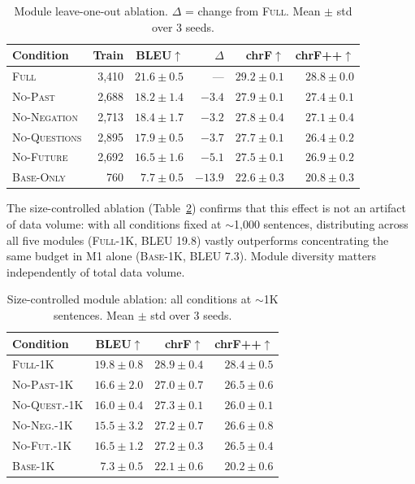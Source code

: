 \documentclass[11pt]{article}
\begin{document}
\begin{table}[t]
\centering
\small
\caption{Module leave-one-out ablation. $\Delta$ = change from \textsc{Full}. Mean $\pm$ std over 3 seeds.}
\label{tab:module_loo}
\begin{tabular}{lrrrrr}
\toprule
\textbf{Condition} & \textbf{Train} & \textbf{BLEU}$\uparrow$ & $\Delta$ & \textbf{chrF}$\uparrow$ & \textbf{chrF++}$\uparrow$ \\
\midrule
\textsc{Full}          & 3,410 & $\mathbf{21.6 \pm 0.5}$ & ---      & $\mathbf{29.2 \pm 0.1}$ & $\mathbf{28.8 \pm 0.0}$ \\
\textsc{No-Past}       & 2,688 & $18.2 \pm 1.4$          & $-3.4$  & $27.9 \pm 0.1$          & $27.4 \pm 0.1$ \\
\textsc{No-Negation}   & 2,713 & $18.4 \pm 1.7$          & $-3.2$  & $27.8 \pm 0.4$          & $27.1 \pm 0.4$ \\
\textsc{No-Questions}  & 2,895 & $17.9 \pm 0.5$          & $-3.7$  & $27.7 \pm 0.1$          & $26.4 \pm 0.2$ \\
\textsc{No-Future}     & 2,692 & $16.5 \pm 1.6$          & $-5.1$  & $27.5 \pm 0.1$          & $26.9 \pm 0.2$ \\
\textsc{Base-Only}     &   760 & $7.7 \pm 0.5$           & $-13.9$ & $22.6 \pm 0.3$          & $20.8 \pm 0.3$ \\
\bottomrule
\end{tabular}
\end{table}

The size-controlled ablation (Table~\ref{tab:module_size_ctrl}) confirms that this effect is not an artifact of data volume: with all conditions fixed at ${\sim}$1,000 sentences, distributing across all five modules (\textsc{Full-1K}, BLEU 19.8) vastly outperforms concentrating the same budget in M1 alone (\textsc{Base-1K}, BLEU 7.3). Module diversity matters independently of total data volume.

\begin{table}[t]
\centering
\small
\caption{Size-controlled module ablation: all conditions at ${\sim}$1K sentences. Mean $\pm$ std over 3 seeds.}
\label{tab:module_size_ctrl}
\begin{tabular}{lrrr}
\toprule
\textbf{Condition} & \textbf{BLEU}$\uparrow$ & \textbf{chrF}$\uparrow$ & \textbf{chrF++}$\uparrow$ \\
\midrule
\textsc{Full-1K}       & $\mathbf{19.8 \pm 0.8}$ & $\mathbf{28.9 \pm 0.4}$ & $\mathbf{28.4 \pm 0.5}$ \\
\textsc{No-Past-1K}    & $16.6 \pm 2.0$          & $27.0 \pm 0.7$ & $26.5 \pm 0.6$ \\
\textsc{No-Quest.-1K}  & $16.0 \pm 0.4$          & $27.3 \pm 0.1$ & $26.0 \pm 0.1$ \\
\textsc{No-Neg.-1K}    & $15.5 \pm 3.2$          & $27.2 \pm 0.7$ & $26.6 \pm 0.8$ \\
\textsc{No-Fut.-1K}    & $16.5 \pm 1.2$          & $27.2 \pm 0.3$ & $26.5 \pm 0.4$ \\
\textsc{Base-1K}       & $7.3 \pm 0.5$           & $22.1 \pm 0.6$ & $20.2 \pm 0.6$ \\
\bottomrule
\end{tabular}
\end{table}
\end{document}
